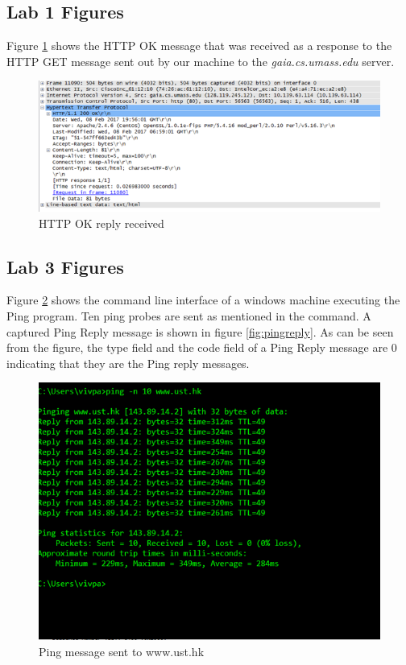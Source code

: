 \documentclass[10pt]{IEEEtran}
\begin{document}
\begin{appendix}

\subsection{Lab 1 Figures}
 Figure \ref{fig:httpok} shows the HTTP OK message that was received as a response to the HTTP GET message sent out by our machine to the \textit{gaia.cs.umass.edu} server.
\begin{figure}[h!]
	\includegraphics[width=\linewidth]{HTTPOK.PNG}
	\caption{HTTP OK reply received}
    \label{fig:httpok}
\end{figure}

\subsection{Lab 3 Figures}
 Figure \ref{fig:cmdping} shows the command line interface of a windows machine executing the Ping program. Ten ping probes are sent as mentioned in the command. A captured Ping Reply message is shown in figure \ref{fig:pingreply}. As can be seen from the figure, the type field and the code field of a Ping Reply message are 0 indicating that they are the Ping reply messages. 
 
\begin{figure}[h!]
	\includegraphics[width=\linewidth]{Ping.png}
	\caption{Ping message sent to www.ust.hk}
    \label{fig:cmdping}
\end{figure}


\end{appendix}
\end{document}
